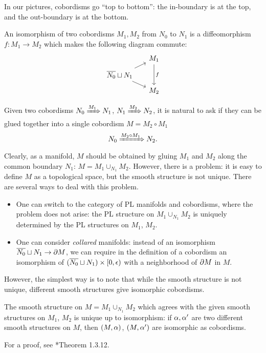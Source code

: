 \begin{convention}\label{conv:cobordism-pictures}
In our pictures, cobordisms go ``top to bottom'':
the in-boundary is at the top, and the out-boundary is at the bottom.
\end{convention}

\begin{definition}\label{d:cobordism-isomorphism}
  An isomorphism of two cobordisms $M_1, M_2$ from $N_0$ to $N_1$ is a
  diffeomorphism $f\colon M_1\to M_2$ which makes the following diagram commute:
  \begin{equation}\label{e:cob-iso}
  \begin{tikzcd}[column sep=5mm, row sep=2mm]
    & M_1\arrow[dd, "f"]\\
    \ov{N_0}\sqcup N_1
    \arrow[ur]
    \arrow[dr]\\
    & M_2
  \end{tikzcd}
  \end{equation}
\end{definition}
Given two cobordisms $N_0\xRightarrow{M_1}N_1$, $N_1\xRightarrow{M_2}N_2$, it is natural to
ask if they can be glued together into a single cobordism $M=M_2\circ M_1$
$$
  N_0\xRightarrow{M_2\circ M_1}N_2.
$$
Clearly, as a manifold, $M$ should be obtained by gluing $M_1$ and $M_2$ along
the common boundary $N_1$: $M= M_1\cup_{N_1} M_2$. However, there is a problem:
it is easy to define $M$ as a topological space, but the smooth structure is not
unique. There are several ways to deal with this problem.
\begin{itemize}
  \item One can switch to the category of PL manifolds and cobordisms,
    where the problem does not arise: the PL structure on $M_1\cup_{N_1} M_2$
    is uniquely determined by the PL structures on $M_1$, $M_2$.
  \item One can consider \emph{collared}
    manifolds: instead of
    an isomorphism $\overline{N_0}\sqcup N_1\to \partial M$,
    we can require in the definition of a cobordism an isomorphism of
    $(\overline{N_0}\sqcup N_1)\times [0, \epsilon)$ with a neighborhood
    of $\partial M$ in $M$.
\end{itemize}
However, the simplest way is to note that while the smooth structure is not
unique, different smooth structures give isomorphic cobordisms.

\begin{theorem}\label{t:gluing-unique}
  The smooth structure on $M=M_1\cup_{N_1} M_2$ which agrees with
  the given smooth structures on $M_1$, $M_2$ is unique up to isomorphism:
  if $\alpha, \alpha'$ are two different smooth structures on $M$, then $(M,\alpha)$,
  $(M,\alpha')$ are isomorphic as cobordisms.
\end{theorem}
For a proof, see *{Theorem 1.3.12}.

